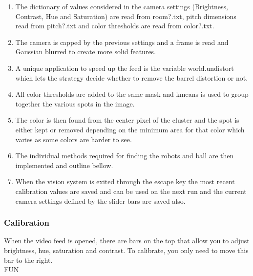 \documentclass[a4paper,12pt]{article}
\begin{document}
\begin{enumerate}
\item The dictionary of values considered in the camera settings (Brightness, Contrast, Hue and Saturation) are read from room?.txt, pitch dimensions read from pitch?.txt and color thresholds are read from color?.txt.
\item The camera is capped by the previous settings and a frame is read and Gaussian blurred to create more solid features.
\item A unique application to speed up the feed is the variable world.undistort which lets the strategy decide whether to remove the barrel distortion or not.
\item All color thresholds are added to the same mask and kmeans is used to group together the various spots in the image.
\item The color is then found from the center pixel of the cluster and the spot is either kept or removed depending on the minimum area for that color which varies as some colors are harder to see.
\item The individual methods required for finding the robots and ball are then implemented and outline bellow.
\item When the vision system is exited through the escape key the most recent calibration values are saved and can be used on the next run and the current camera settings defined by the slider bars are saved also.
\end{enumerate}

\subsubsection{Calibration}
When the video feed is opened, there are bars on the top that allow you to adjust brightness, hue, saturation and contrast. To calibrate, you only need to move this bar to the right. 
\\FUN
\end{document}

